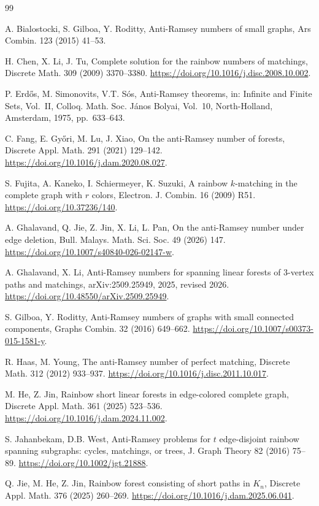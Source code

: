 \documentclass[12pt]{article}
\begin{document}
\begin{thebibliography}{99}

A. Bialostocki, S. Gilboa, Y. Roditty,
Anti-Ramsey numbers of small graphs,
Ars Combin. 123 (2015) 41--53.

H. Chen, X. Li, J. Tu,
Complete solution for the rainbow numbers of matchings,
Discrete Math. 309 (2009) 3370--3380.
\url{https://doi.org/10.1016/j.disc.2008.10.002}.

P. Erd\H{o}s, M. Simonovits, V.T. S\'os,
Anti-Ramsey theorems,
in: Infinite and Finite Sets, Vol.~II,
Colloq. Math. Soc. J\'anos Bolyai, Vol.~10,
North-Holland, Amsterdam, 1975, pp.~633--643.

C. Fang, E. Gy\H{o}ri, M. Lu, J. Xiao,
On the anti-Ramsey number of forests,
Discrete Appl. Math. 291 (2021) 129--142.
\url{https://doi.org/10.1016/j.dam.2020.08.027}.

S. Fujita, A. Kaneko, I. Schiermeyer, K. Suzuki,
A rainbow $k$-matching in the complete graph with $r$ colors,
Electron. J. Combin. 16 (2009) R51.
\url{https://doi.org/10.37236/140}.

A. Ghalavand, Q. Jie, Z. Jin, X. Li, L. Pan,
On the anti-Ramsey number under edge deletion,
Bull. Malays. Math. Sci. Soc. 49 (2026) 147.
\url{https://doi.org/10.1007/s40840-026-02147-w}.

A. Ghalavand, X. Li,
Anti-Ramsey numbers for spanning linear forests of 3-vertex paths and matchings,
arXiv:2509.25949, 2025, revised 2026.
\url{https://doi.org/10.48550/arXiv.2509.25949}.

S. Gilboa, Y. Roditty,
Anti-Ramsey numbers of graphs with small connected components,
Graphs Combin. 32 (2016) 649--662.
\url{https://doi.org/10.1007/s00373-015-1581-y}.

R. Haas, M. Young,
The anti-Ramsey number of perfect matching,
Discrete Math. 312 (2012) 933--937.
\url{https://doi.org/10.1016/j.disc.2011.10.017}.

M. He, Z. Jin,
Rainbow short linear forests in edge-colored complete graph,
Discrete Appl. Math. 361 (2025) 523--536.
\url{https://doi.org/10.1016/j.dam.2024.11.002}.

S. Jahanbekam, D.B. West,
Anti-Ramsey problems for $t$ edge-disjoint rainbow spanning subgraphs:
cycles, matchings, or trees,
J. Graph Theory 82 (2016) 75--89.
\url{https://doi.org/10.1002/jgt.21888}.

Q. Jie, M. He, Z. Jin,
Rainbow forest consisting of short paths in $K_n$,
Discrete Appl. Math. 376 (2025) 260--269.
\url{https://doi.org/10.1016/j.dam.2025.06.041}.


\end{thebibliography}
\end{document}
